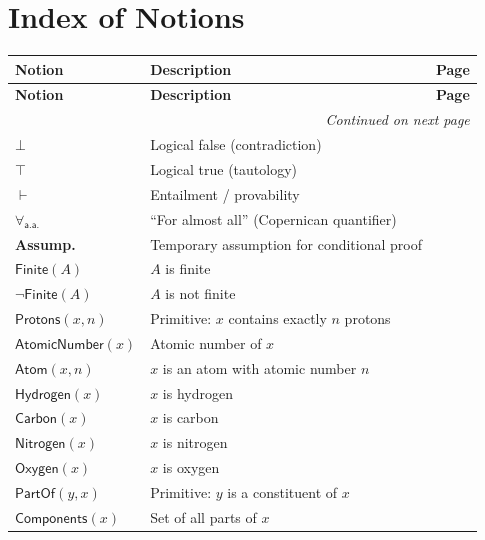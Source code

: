 \documentclass{amsart}
\newcommand{\Finite}[1]{\mathsf{Finite}(#1)}
\newcommand{\NotFinite}[1]{\neg\mathsf{Finite}(#1)}
\newenvironment{notiontable}{%
	\renewcommand{\arraystretch}{1.2}%
	\setlength{\tabcolsep}{4pt}%
	\begin{longtable}{|l|l|c|}
		\hline
		\textbf{Notion} & \textbf{Description} & \textbf{Page} \\
		\hline
		\endfirsthead
		\hline
		\textbf{Notion} & \textbf{Description} & \textbf{Page} \\
		\hline
		\endhead
		\hline
		\multicolumn{3}{r}{\textit{Continued on next page}} \\
		\endfoot
		\hline
		\endlastfoot
	}{%
	\end{longtable}%
}
\theoremstyle{break}
\newcommand{\Forall}{\forall}
\newcommand{\idx}[1]{\index{#1}}
\begin{document}
\section{Index of Notions}
\label{sec:index}
\idx{Index of Notions}
\fontsize{9}{15}\selectfont

\begin{notiontable}
	$\bot$ & Logical false (contradiction) & \pageref{eq:bot} \\
	$\top$ & Logical true (tautology) & \pageref{eq:top} \\
	$\vdash$ & Entailment / provability & \pageref{eq:entailment} \\
	$\Forall_{\mathsf{a.a.}}$ & “For almost all” (Copernican quantifier) & \pageref{ax:COP} \\
	\textbf{Assump.} & Temporary assumption for conditional proof & \pageref{sec:proof-tables} \\
	
	$\Finite{A}$ & $A$ is finite  & \pageref{def:finite} \\
	$\NotFinite{A}$ & $A$ is not finite  & \pageref{def:not-finite} \\
	
	$\mathsf{Protons}(x,n)$ & Primitive: $x$ contains exactly $n$ protons & \pageref{def:protons} \\
	$\mathsf{AtomicNumber}(x)$ & Atomic number of $x$ & \pageref{def:atomicnumber} \\
	$\mathsf{Atom}(x,n)$ & $x$ is an atom with atomic number $n$ & \pageref{def:atom} \\
	$\mathsf{Hydrogen}(x)$ & $x$ is hydrogen & \pageref{def:hydrogen} \\
	$\mathsf{Carbon}(x)$ & $x$ is carbon & \pageref{def:carbon} \\
	$\mathsf{Nitrogen}(x)$ & $x$ is nitrogen & \pageref{def:nitrogen} \\
	$\mathsf{Oxygen}(x)$ & $x$ is oxygen & \pageref{def:oxygen} \\
	$\mathsf{PartOf}(y,x)$ & Primitive: $y$ is a constituent of $x$ & \pageref{def:partof} \\
	$\mathsf{Components}(x)$ & Set of all parts of $x$ & \pageref{def:components} \\
	

\end{notiontable}
\end{document}
